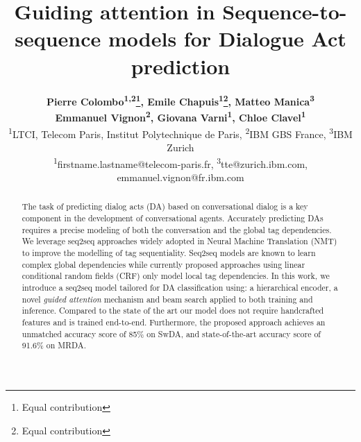 \documentclass[letterpaper]{article} \usepackage{aaai20}  \usepackage{times}  \usepackage{helvet} \usepackage{courier}  \usepackage[hyphens]{url}  \usepackage{graphicx} \urlstyle{rm} \def\UrlFont{\rm}  \usepackage{graphicx}  \frenchspacing  \setlength{\pdfpagewidth}{8.5in}  \setlength{\pdfpageheight}{11in}
\title{Guiding attention in Sequence-to-sequence models for Dialogue Act prediction}
\author{ \textbf{Pierre Colombo\textsuperscript{\rm 1,2}\thanks{Equal contribution}, Emile Chapuis\textsuperscript{\rm 1}\footnote[1]{Equal contribution}, Matteo Manica\textsuperscript{\rm 3}}\\ \Large \textbf{Emmanuel Vignon\textsuperscript{\rm 2}, Giovana Varni\textsuperscript{\rm 1}, Chloe Clavel\textsuperscript{\rm 1}}\\
\textsuperscript{\rm 1}LTCI, Telecom Paris, Institut Polytechnique de Paris, \textsuperscript{\rm 2}IBM GBS France, \textsuperscript{\rm 3}IBM Zurich\\
\textsuperscript{\rm 1}firstname.lastname@telecom-paris.fr, \textsuperscript{\rm 3}tte@zurich.ibm.com, emmanuel.vignon@fr.ibm.com 
}
\begin{document}
\maketitle
\begin{abstract}

The task of predicting dialog acts (DA) based on conversational dialog is a key component in the development of conversational agents. Accurately predicting DAs requires a precise modeling of both the conversation and the global tag dependencies. We leverage seq2seq approaches widely adopted in Neural Machine Translation (NMT) to improve the modelling of tag sequentiality. Seq2seq models are known to learn complex global dependencies while currently proposed approaches using linear conditional random fields (CRF) only model local tag dependencies.  In this work, we introduce a seq2seq model tailored for DA classification using: a hierarchical encoder, a novel \textit{guided attention} mechanism and beam search applied to both training and inference. Compared to the state of the art our model does not require handcrafted features and is trained end-to-end. Furthermore, the proposed approach achieves an unmatched accuracy score of 85\% on SwDA, and state-of-the-art accuracy score of 91.6\% on MRDA.

\end{abstract}
\end{document}
